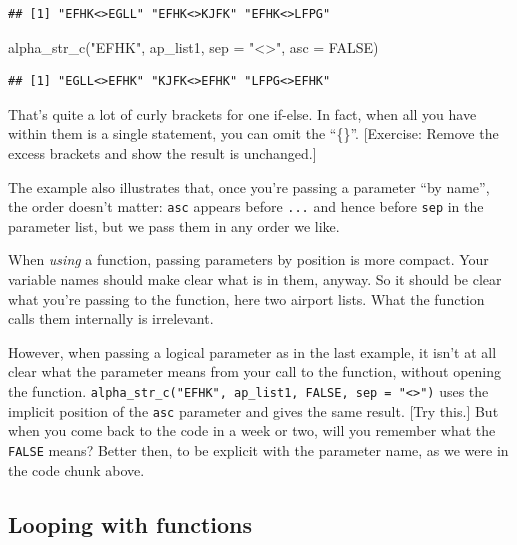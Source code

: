 \documentclass[
]{book}
\newenvironment{Shaded}{\begin{snugshade}}{\end{snugshade}}
\newcommand{\AttributeTok}[1]{\textcolor[rgb]{0.77,0.63,0.00}{#1}}
\newcommand{\ConstantTok}[1]{\textcolor[rgb]{0.00,0.00,0.00}{#1}}
\newcommand{\FunctionTok}[1]{\textcolor[rgb]{0.00,0.00,0.00}{#1}}
\newcommand{\NormalTok}[1]{#1}
\newcommand{\StringTok}[1]{\textcolor[rgb]{0.31,0.60,0.02}{#1}}
\begin{document}
\begin{verbatim}
## [1] "EFHK<>EGLL" "EFHK<>KJFK" "EFHK<>LFPG"
\end{verbatim}

\begin{Shaded}
\begin{Highlighting}[]
\FunctionTok{alpha\_str\_c}\NormalTok{(}\StringTok{"EFHK"}\NormalTok{, ap\_list1, }\AttributeTok{sep =} \StringTok{"\textless{}\textgreater{}"}\NormalTok{, }\AttributeTok{asc =} \ConstantTok{FALSE}\NormalTok{)}
\end{Highlighting}
\end{Shaded}

\begin{verbatim}
## [1] "EGLL<>EFHK" "KJFK<>EFHK" "LFPG<>EFHK"
\end{verbatim}

That's quite a lot of curly brackets for one if-else. In fact, when all you have within them is a single statement, you can omit the ``\{\}''. {[}Exercise: Remove the excess brackets and show the result is unchanged.{]}

The example also illustrates that, once you're passing a parameter ``by name'', the order doesn't matter: \texttt{asc} appears before \texttt{...} and hence before \texttt{sep} in the parameter list, but we pass them in any order we like.

When \emph{using} a function, passing parameters by position is more compact. Your variable names should make clear what is in them, anyway. So it should be clear what you're passing to the function, here two airport lists. What the function calls them internally is irrelevant.

However, when passing a logical parameter as in the last example, it isn't at all clear what the parameter means from your call to the function, without opening the function. \texttt{alpha\_str\_c("EFHK",\ ap\_list1,\ FALSE,\ sep\ =\ "\textless{}\textgreater{}")} uses the implicit position of the \texttt{asc} parameter and gives the same result. {[}Try this.{]} But when you come back to the code in a week or two, will you remember what the \texttt{FALSE} means? Better then, to be explicit with the parameter name, as we were in the code chunk above.

\hypertarget{looping-with-functions}{%
\subsection{Looping with functions}\label{looping-with-functions}}
\end{document}
